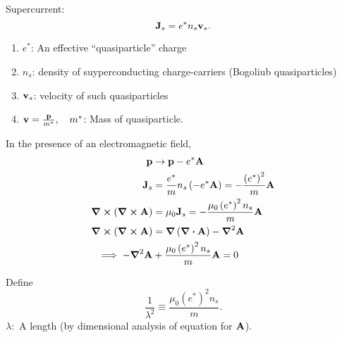 Supercurrent:
\begin{equation} 
\vb J_s = e^*n_s\vb v_s.
\end{equation}
\begin{enumerate}[]
	\item $e^*$: An effective ``quasiparticle'' charge
	\item $n_s$: density of suyperconducting charge-carriers (Bogoliub quasiparticles)
	\item $\vb v_s$: velocity of such quasiparticles
	\item $\vb v = \frac{\vb p}{m^*},\quad m^*$: Mass of quasiparticle.
\end{enumerate}
In the presence of an electromagnetic field,
\begin{align} 
\vb p &\rightarrow \vb p - e^*\vb A\\
\vb J_s &= \frac{e^*}{m}n_s\left( -e^*\vb A \right) = -\frac{\left(e^*\right)^2}{m}\vb A \\
\curl{(\curl{\vb A})} &= \mu_0\vb J_s = -\frac{\mu_0\left( e^* \right)^2n_s}{m}\vb A\\
\curl{\left( \curl{\vb A \right)}} &= \grad{\left( \div{\vb A} \right)} -\grad^2\vb A \\
\implies -\grad^2\vb A &+  \frac{\mu_0\left( e^* \right)^2n_s}{m}\vb A = 0
\end{align}

Define 
\begin{equation} 
\frac{1}{\lambda^2} \equiv \frac{\mu_0\left( e^* \right)^2n_s}{m}.
\end{equation}
$\lambda:$ A length (by dimensional analysis of equation for $\vb A$).

